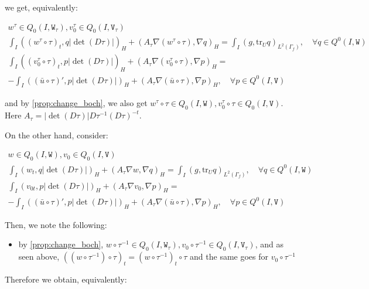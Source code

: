 \documentclass[english,a4paper,9pt,oneside]{scrbook}	%
\theoremstyle{break}
\theoremstyle{remark}
\newcommand{\tr}{\text{tr}}
\newcommand{\tred}[1]{\textcolor{red}{#1}}
\newcommand{\tw}[1]{\texttt{#1}}
\begin{document}
\begin{appendices}
we get, equivalently:

\begin{align*}
w^\tau \in Q_0(I, \tw{W}_\tau), v_0^\tau \in Q_0(I,\tw{V}_\tau) \\
\int_I ( (w^\tau\circ \tau)_t , q |\det(D\tau)|)_H+ (A_\tau\nabla (w^\tau\circ \tau), \nabla q)_{H} = \int_I(g,\tr_{U} q)_{L^2(\Gamma_f)}, \quad \forall q \in Q^0(I, \tw{W}) \\
\int_I ( (v_0^\tau\circ \tau)_t,p |\det(D\tau)|)_H + (A_\tau \nabla (v_0^\tau\circ \tau), \nabla p)_{H}=\\ -\int_I((\bar{u}\circ \tau)',p|\det(D\tau)|)_{H}+(A_\tau \nabla (\bar{u} \circ \tau), \nabla p)_{H}, \quad \forall p \in Q^0(I, \tw{V})
\end{align*}

and by \cref{prop:change_boch}, we also get $w^\tau\circ \tau \in Q_0(I,\tw{W}), v_0^\tau\circ \tau \in Q_0(I,\tw{V})$. Here $A_\tau = |\det(D\tau)|D\tau^{-1}(D\tau)^{-t}$.



On the other hand, consider:

\begin{align*}
w \in Q_0(I, \tw{W}), v_0 \in Q_0(I,\tw{V}) \\
\int_I ( w_t , q |\det(D\tau)|)_H+ (A_\tau\nabla w, \nabla q)_{H} =\int_I(g,\tr_{U} q)_{L^2(\Gamma_f)}, \quad \forall q \in Q^0(I, \tw{W}) \\
\int_I ( v_{0t},p |\det(D\tau)|)_H + (A_\tau \nabla v_0, \nabla p)_{H}=\\ -\int_I((\bar{u}\circ \tau)',p|\det(D\tau)|)_{H}+(A_\tau \nabla (\bar{u} \circ \tau), \nabla p)_{H}, \quad \forall p \in Q^0(I, \tw{V})
\end{align*}

Then, we note the following:

\begin{itemize}
	\item by \cref{prop:change_boch}, $w\circ \tau^{-1} \in Q_0(I, \tw{W}_\tau), v_0\circ \tau^{-1} \in Q_0(I,\tw{V}_\tau) $, and as seen above, $((w\circ \tau^{-1})\circ \tau)_t = (w\circ \tau^{-1})_t\circ \tau$ and the same goes for $v_0\circ \tau^{-1}$
\end{itemize}

Therefore we obtain, equivalently:


\end{appendices}
\end{document}
